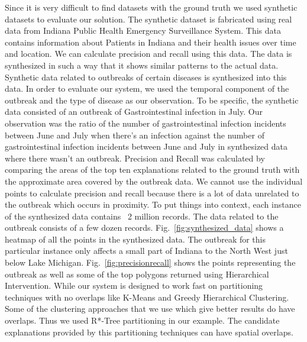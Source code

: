 Since it is very difficult to find datasets with the ground truth we used synthetic datasets to evaluate our solution\cite{maciejewski2009generating}. The synthetic dataset is fabricated using real data from Indiana Public Health Emergency Surveillance System. This data contains information about Patients in Indiana and their health issues over time and location. We can calculate precision and recall using this data\cite{powers2011evaluation}. The data is synthesized in such a way that it shows similar patterns to the actual data. Synthetic data related to outbreaks of certain diseases is synthesized into this data. In order to evaluate our system, we used the temporal component of the outbreak and the type of disease as our observation. To be specific, the synthetic data consisted of an outbreak of Gastrointestinal infection in July. Our observation was the ratio of the number of gastrointestinal infection incidents between June and July when there's an infection against the number of gastrointestinal infection incidents between June and July in synthesized data where there wasn't an outbreak. Precision and Recall was calculated by comparing the areas of the top ten explanations related to the ground truth with the approximate area covered by the outbreak data. We cannot use the individual points to calculate precision and recall because there is a lot of data unrelated to the outbreak which occurs in proximity. To put things into context, each instance of the synthesized data contains ~2 million records. The data related to the outbreak consists of a few dozen records. Fig.~\ref{fig:synthesized_data} shows a heatmap of all the points in the synthesized data. The outbreak for this particular instance only affects a small part of Indiana to the North West just below Lake Michigan. Fig.~\ref{fig:precisionrecall} shows the points representing the outbreak as well as some of the top polygons returned using Hierarchical Intervention. While our system is designed to work fast on partitioning techniques with no overlaps like K-Means and Greedy Hierarchical Clustering. Some of the clustering approaches that we use which give better results do have overlaps. Thus we used R*-Tree partitioning in our example. The candidate explanations provided by this partitioning techniques can have spatial overlaps.


